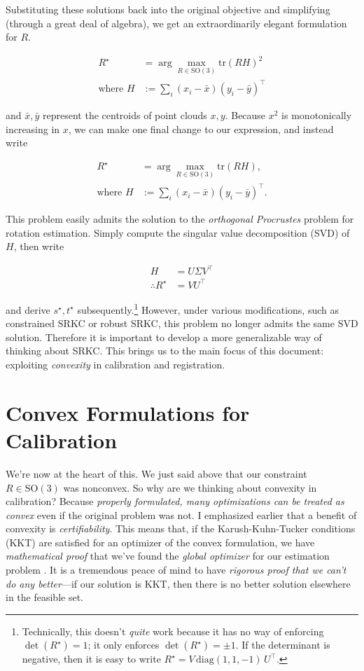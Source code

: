 \documentclass[conference]{IEEEtran}
\begin{document}
Substituting these solutions back into the original objective and simplifying (through a great deal of algebra), we get an extraordinarily elegant formulation for \( R \).

\begin{align}
	R^\star &= \arg\max_{R \in \mathrm{SO(3)}} \mathrm{tr}( RH )^2 \\
	\text{where } H &:= \sum_i (x_i - \bar{x}) (y_i - \bar{y})^\top
\end{align}

and \( \bar{x}, \bar{y} \) represent the centroids of point clouds \( x, y \).  Because \( x^2 \) is monotonically increasing in \( x \), we can make one final change to our expression, and instead write

\begin{align}
	R^\star &= \arg\max_{R \in \mathrm{SO(3)}} \mathrm{tr}( RH ), \\
	\text{where } H &:= \sum_i (x_i - \bar{x}) (y_i - \bar{y})^\top \label{eq:h} .
\end{align}

This problem easily admits the solution to the \textit{orthogonal Procrustes} problem for rotation estimation.  Simply compute the singular value decomposition (SVD) of \( H \), then write

\begin{align}
	H &= U \Sigma V^\top \\
	\therefore R^\star &= V U^\top
\end{align}

and derive \( s^\star, t^\star \) subsequently.\footnote{Technically, this doesn't \textit{quite} work because it has no way of enforcing \( \det(R^\star) = 1 \); it only enforces \( \det(R^\star) = \pm 1 \).  If the determinant is negative, then it is easy to write \( R^\star = V \, \mathrm{diag}(1, 1, -1) \, U^\top \). }  However, under various modifications, such as constrained SRKC or robust SRKC, this problem no longer admits the same SVD solution.  Therefore it is important to develop a more generalizable way of thinking about SRKC.  This brings us to the main focus of this document: exploiting \textit{convexity} in calibration and registration.

\section{Convex Formulations for Calibration}

We're now at the heart of this.  We just said above that our constraint \( R \in \mathrm{SO(3)} \) was nonconvex.  So why are we thinking about convexity in calibration?  Because \textit{properly formulated, many optimizations can be treated as convex} even if the original problem was not.  I emphasized earlier that a benefit of convexity is \textit{certifiability}.  This means that, if the Karush-Kuhn-Tucker conditions (KKT) are satisfied for an optimizer of the convex formulation, we have \textit{mathematical proof} that we've found the \textit{global optimizer} for our estimation problem \cite{kkt}.  It is a tremendous peace of mind to have \textit{rigorous proof that we can't do any better}---if our solution is KKT, then there is no better solution elsewhere in the feasible set.
\end{document}

